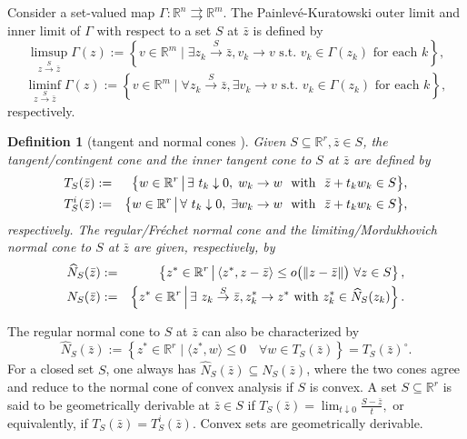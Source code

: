 \documentclass[11pt]{article}
\numberwithin{equation}{section}
\newtheorem{definition}{Definition}[section]
\begin{document}
{Consider  a set-valued map $\Gamma: \mathbb{R}^n \rightrightarrows \mathbb{R}^m$. The Painlevé-Kuratowski outer limit and inner limit of $\Gamma$ with respect to a set $S$ at $\bar z$ is defined by
$$
\limsup _{z \overset{S}{\to} \bar z} \Gamma(z):=\left\{v \in \mathbb{R}^m \mid \exists  z_k \overset{S}{\to} \bar z, v_k \rightarrow v \text { s.t. } v_k \in \Gamma\left(z_k\right) \text { for each } k\right\},
$$
$$
\liminf _{z \overset{S}{\to} \bar z} \Gamma(z):=\left\{v \in \mathbb{R}^m \mid \forall z_k \overset{S}{\to} \bar z, \exists v_k \rightarrow v \text { s.t. } v_k \in \Gamma\left(z_k\right) \text { for each } k\right\},
$$
respectively.

\begin{definition}[tangent and normal cones \cite{BonSh00,RoWe98}]
Given  $S\subseteq\mathbb{R}^r, \bar z\in S$, the tangent/contingent cone and the inner tangent cone to $S$ at $\bar z$ are defined by 
\begin{eqnarray*}
 T_S(\bar z)&:=&
  \big\{w \in\mathbb{R}^r \, \big| \, \exists \ t_k\downarrow 0,\; w_k\to w \ \ {\rm with}
 \ \ \bar z+t_k w_k\in S \big\},\\
 T^i_S(\bar z)&:=&
  \big\{w \in\mathbb{R}^r \, \big| \, \forall \ t_k\downarrow 0,\; \exists w_k\to w \ \ {\rm with}
 \ \ \bar z+t_k w_k\in S \big\},
 \end{eqnarray*}
respectively.
 The regular/Fr\'echet normal cone 
 and the limiting/Mordukhovich normal cone to $S$ at $\bar z$ are given, respectively, by
 \begin{eqnarray*}
 \widehat{N}_S(\bar z)&:=&\left\{z^*\in \mathbb{R}^r \, \big| \, \langle z^*, z-\bar z\rangle \le
 o\big(\|z-\bar z\|\big) \ \forall z\in S\right\},\\
 N_S(\bar z)&:=&
 \left \{z^* \in \mathbb{R}^r \, \Big| \, \exists \ z_k \overset{S}{\to} \bar z, z^*_{k}\rightarrow z^* \ {\rm with }\  z^*_{k}\in \widehat{N}_{S}(z_k) \right \}.
\end{eqnarray*}
\end{definition}


The regular normal cone to $S$ at $\bar{z}$ \cite[Proposition 6.5]{RoWe98} can also be characterized by
\begin{equation}\label{normalcone-equ}
\widehat{N}_{S}(\bar{z}):=\left\{z^* \in \mathbb{R}^{r} \mid \langle z^*, w\rangle \leq 0 \quad \forall w\in T_S(\bar z)\right\} = T_S(\bar z)^{\circ}.
\end{equation}
For a closed set $S$, one always has $\widehat{N}_{S}(\bar{z}) \subseteq {N}_{S}(\bar{z})$, where the two cones agree and reduce to the normal cone of convex analysis if $S$ is convex. 
A set $S \subseteq \mathbb{R}^r$ is said to be geometrically derivable at $\bar z \in S$ if 
$T_S(\bar z) = \lim_{t \downarrow 0} \frac{S - \bar z}{t},$
or equivalently, if $T_S(\bar z) = T_S^i(\bar z).$
 Convex sets are geometrically derivable.

}
\end{document}
